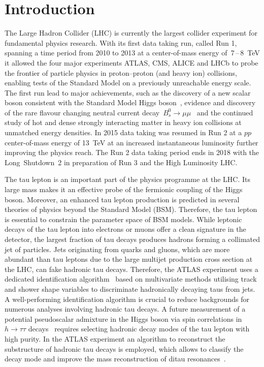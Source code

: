 \chapter*{Introduction}
\label{sec:intro}

The Large Hadron Collider (LHC) is currently the largest collider experiment for
fundamental physics research. With its first data taking run, called Run 1,
spanning a time period from 2010 to 2013 at a center-of-mass energy
of~\num{7}\,--\,\SI{8}{\TeV} it allowed the four major experiments ATLAS, CMS,
ALICE and LHCb to probe the frontier of particle physics in proton--proton (and
heavy ion) collisions, enabling tests of the Standard Model on a previously
unreachable energy scale. The first run lead to major achievements, such as the
discovery of a new scalar boson consistent with the Standard Model Higgs
boson~\cite{higgs_atlas, higgs_cms}, evidence and discovery of the rare flavour
changing neutral current decay~$B_s^0 \to \mu \mu$~\cite{lhcb_bs_mumu,
  cms_bs_mumu} and the continued study of hot and dense strongly interacting
matter in heavy ion collisions at unmatched energy densities. In 2015 data
taking was resumed in Run 2 at a $pp$ center-of-mass energy of \SI{13}{\TeV} at
an increased instantaneous luminosity further improving the physics reach. The
Run 2 data taking period ends in 2018 with the Long~Shutdown~2 in preparation of
Run 3 and the High Luminosity LHC.

The tau lepton is an important part of the physics programme at the LHC. Its
large mass makes it an effective probe of the fermionic coupling of the Higgs
boson. Moreover, an enhanced tau lepton production is predicted in several
theories of physics beyond the Standard Model (BSM). Therefore, the tau lepton
is essential to constrain the parameter space of BSM models. While leptonic
decays of the tau lepton into electrons or muons offer a clean signature in the
detector, the largest fraction of tau decays produces hadrons forming a
collimated jet of particles. Jets originating from quarks and gluons, which are
more abundant than tau leptons due to the large multijet production cross
section at the LHC, can fake hadronic tau decays. Therefore, the ATLAS
experiment uses a dedicated identification algorithm~\cite{atlas:taurec:run1,
  atlas:taurec:run2} based on multivariate methods utilising track and shower
shape variables to discriminate hadronically decaying taus from jets. A
well-performing identification algorithm is crucial to reduce backgrounds for
numerous analyses involving hadronic tau decays. A future measurement of a
potential pseudoscalar admixture in the Higgs boson via spin correlations in
$h \to \tau\tau$ decays~\cite{desch_higgs_cp, harnik, Berge2014} requires
selecting hadronic decay modes of the tau lepton with high purity. In the ATLAS
experiment an algorithm to reconstruct the substructure of hadronic tau decays
is employed, which allows to classify the decay mode and improve the mass
reconstruction of ditau resonances~\cite{atlas:taurec:decaymodes}.

